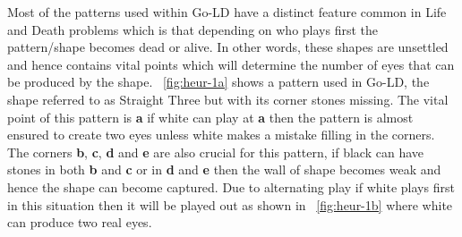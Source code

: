 \documentclass{l4proj}
\newcommand{\bo}[1]{\textbf{#1}}
\begin{document}
Most of the patterns used within Go-LD have a distinct feature common in Life and Death problems which is that depending on who plays first the pattern/shape becomes dead or alive. In other words, these shapes are unsettled and hence contains vital points which will determine the number of eyes that can be produced by the shape. ~\autoref{fig:heur-1a} shows a pattern used in Go-LD, the shape referred to as Straight Three but with its corner stones missing. The vital point of this pattern is \bo{a} if white can play at \bo{a} then the pattern is almost ensured to create two eyes unless white makes a mistake filling in the corners. The corners \bo{b}, \bo{c}, \bo{d} and \bo{e} are also crucial for this pattern, if black can have stones in both \bo{b} and \bo{c}  or  in \bo{d} and \bo{e} then the wall of shape becomes weak and hence the shape can become captured. Due to alternating play if white plays first in this situation then it will be played out as shown in ~\autoref{fig:heur-1b} where white can produce two real eyes.
\end{document}
